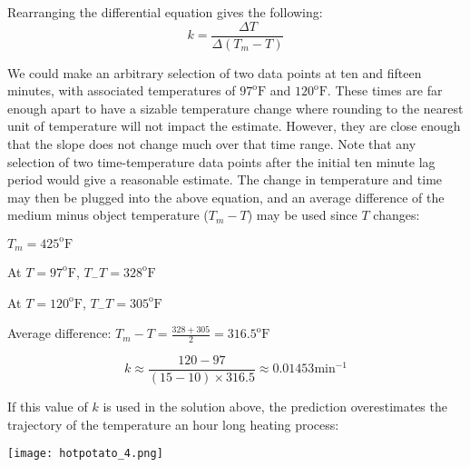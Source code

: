 \documentclass{ximera}
\begin{document}
Rearranging the differential equation gives the following:
\[
k=\frac{\Delta T}{\Delta(T_m-T)}
\]

We could make an arbitrary selection of two data points at ten and fifteen minutes, with associated temperatures of $97^{\text{o}}\text{F}$ and $120^{\text{o}}\text{F}$.  These times are far enough apart to have a sizable temperature change where rounding to the nearest unit of temperature will not impact the estimate.  However, they are close enough that the slope does not change much over that time range.  Note that any selection of two time-temperature data points after the initial ten minute lag period would give a reasonable estimate.  The change in temperature and time may then be plugged into the above equation, and an average difference of the medium minus object temperature ($T_m-T$) may be used since $T$ changes:
\begin{center}
$T_m=425^{\text{o}}\text{F}$

At $T=97^{\text{o}}\text{F}$, $T_-T=328^{\text{o}}\text{F}$

At $T=120^{\text{o}}\text{F}$, $T_-T=305^{\text{o}}\text{F}$

Average difference: $T_m-T=\frac{328+305}{2}=316.5^{\text{o}}\text{F}$
\end{center}
\[
k\approx\frac{120-97}{(15-10)\times316.5}\approx 0.01453\text{min}^{-1}
\]

If this value of $k$ is used in the solution above, the prediction overestimates the trajectory of the temperature an hour long heating process:

\begin{image}
\texttt{[image: hotpotato\_4.png]}
\end{image}
\end{document}
